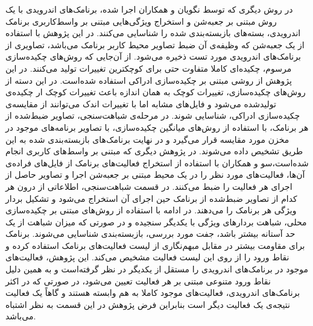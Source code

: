 در روش دیگری که توسط نگویان و همکاران اجرا شده‌، برنامک‌های اندرویدی با یک روش مبتنی بر جعبه‌شن و استخراج ویژگی‌هایی مبتنی بر واسط‌کاربری برنامک اندرویدی، بسته‌های بازبسته‌بندی شده را شناسایی می‌کنند. در این پژوهش با استفاده از یک جعبه‌شن که وظیفه‌ی آن ضبط تصاویر محیط کاربر برنامک می‌باشد، تصاویری از برنامک‌های اندرویدی مورد تست ذخیره می‌شود. از آن‌جایی که روش‌های چکیده‌سازی مرسوم، چکیده‌ای کاملا متفاوت حتی برای کوچکترین تغییرات تولید می‌کنند. در این پژوهش از روشی مبتنی بر چکیده‌سازی ادراکی استفاده شده‌است. در این دسته از روش‌های چکیده‌سازی، تغییرات کوچک به همان اندازه باعث تغییرات کوچک ار چکیده‌ی تولید‌شده می‌شود و فایل‌های مشابه اما با تغییرات اندک می‌توانند از مقایسه‌ی چکیده‌سازی ادراکی، شناسایی شوند. در مرحله‌ی شباهت‌سنجی، تصاویر ضبط‌شده از هر برنامک، با استفاده از روش‌های میانگین چکیده‌سازی، با تصاویر برنامه‌های موجود در مخزن مورد مقایسه قرار می‌گیرد و در نهایت برنامک‌های بازبسته‌بندی شده به این طریق تشخیص داده می‌شوند. در پژوهش دیگری که مبتنی بر واسط‌های کاربری انجام‌ شده‌است،سو و همکاران با استفاده از استخراج فعالیت‌های برنامک از فایل‌های فراده‌ی آن‌ها، فعالیت‌های مورد نظر را در یک محیط مبتنی بر جعبه‌شن اجرا و تصاویر حاصل از اجرای هر فعالیت را ضبط می‌کنند. در قسمت شباهت‌سنجی، اطلاعاتی از درون هر کدام از تصاویر ضبط‌شده از برنامک حین اجرای آن‌ استخراج می‌شود و تشکیل بردار ویژگی هر برنامک را می‌دهند. در ادامه با استفاده از روش‌های مبتنی بر چکیده‌سازی محلی، شباهت بردار‌های ویژگی با یکدیگر سنجیده و در صورتی که میزان شباهت از یک حد آستانه بیشتر باشد، جفت مورد بررسی، بازبسته‌بندی شناسایی می‌شوند. برنامک برای مقاومت بیشتر در مقابل مبهم‌نگاری از لیست فعالیت‌های برنامک استفاده کرده و نقاط ورود را از روی این لیست فعالیت مشخیص می‌کند. این پژوهش، فعالیت‌های موجود در برنامک‌های اندرویدی را مستقل از یکدیگر در نظر گرفته‌است و به همین دلیل نقاط ورود متنوعی مبتنی بر هر فعالیت تعیین می‌شود، در صورتی که در اکثر برنامک‌های اندرویدی، فعالیت‌های موجود کاملا به هم وابسته هستند و گاهاً یک فعالیت نتیجه‌ی یک فعالیت دیگر است بنابراین فرض پژوهش در این قسمت به نظر اشتباه می‌باشد.\\
